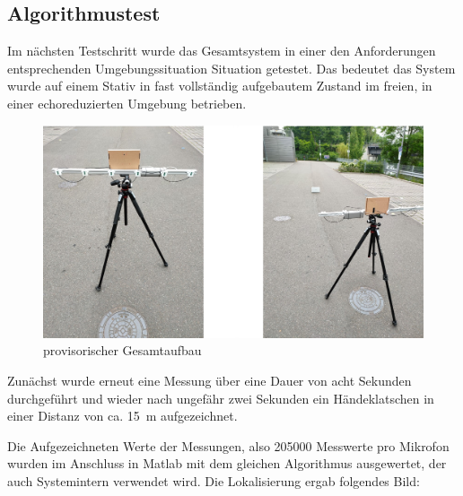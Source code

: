 \label{tab: Kabelfunktionstest Nr. 3}

\subsection{Algorithmustest}

Im nächsten Testschritt wurde das Gesamtsystem in einer den Anforderungen entsprechenden Umgebungssituation Situation getestet. Das bedeutet das System wurde auf einem Stativ in fast vollständig aufgebautem Zustand im freien, in einer echoreduzierten Umgebung betrieben.

\begin{figure}[h]
	\begin{center}
		\includegraphics[scale=0.1]{Sections/Tests/Gesamtaufbau}
	\end{center}
	\caption{provisorischer Gesamtaufbau}
	\label{fig:Test_4}
\end{figure}

Zunächst wurde erneut eine Messung über eine Dauer von acht Sekunden durchgeführt und wieder nach ungefähr zwei Sekunden ein Händeklatschen in einer Distanz von ca. \SI{15}{m} aufgezeichnet.

Die Aufgezeichneten Werte  der Messungen, also 205000 Messwerte pro Mikrofon wurden im Anschluss in Matlab mit dem gleichen Algorithmus ausgewertet, der auch Systemintern verwendet wird. Die Lokalisierung ergab folgendes Bild:

